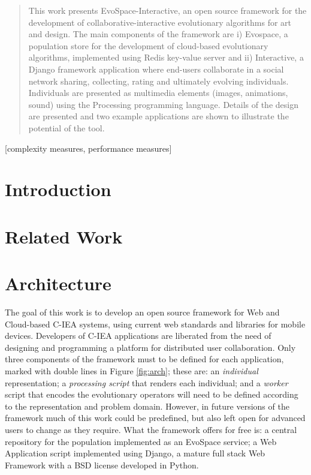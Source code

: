 \documentclass{sig-alternate}
\begin{document}
\maketitle
\begin{abstract}
	

This work presents EvoSpace-Interactive, an open source framework for the development of collaborative-interactive evolutionary algorithms for art and design. The main components of the framework are i) Evospace, a population store for the development of
cloud-based evolutionary algorithms, implemented using Redis key-value server and ii) Interactive, a Django framework   application where end-users collaborate in a social network sharing, collecting, rating and ultimately evolving individuals. Individuals are presented as multimedia elements (images, animations, sound) using the Processing programming language.    Details of the design are presented and two example applications are shown to illustrate the potential of the tool.
\end{abstract}

[complexity measures, performance measures]



\section{Introduction}
\section{Related Work}


\section{Architecture}
The goal of this work is to develop an open source framework for Web and Cloud-based C-IEA systems,
using current web standards and libraries for mobile devices. 
Developers of C-IEA applications are liberated from the need of designing and programming a platform for distributed user collaboration.
Only three components of the framework  must to be defined for each application, marked with double lines in Figure \ref{fig:arch}; these are: an \emph{individual} representation; a \emph{processing script} that renders each individual; and a \emph{worker} script that encodes the evolutionary operators will need to be defined according to the representation and problem domain.
However, in future versions of the framework much of this work could be predefined, but also left open for advanced users to change as they require.
What the framework offers for free is: a central repository for the population implemented as an EvoSpace service; a Web Application script implemented using Django, a mature full stack Web Framework with a BSD license developed in Python.
\end{document}
